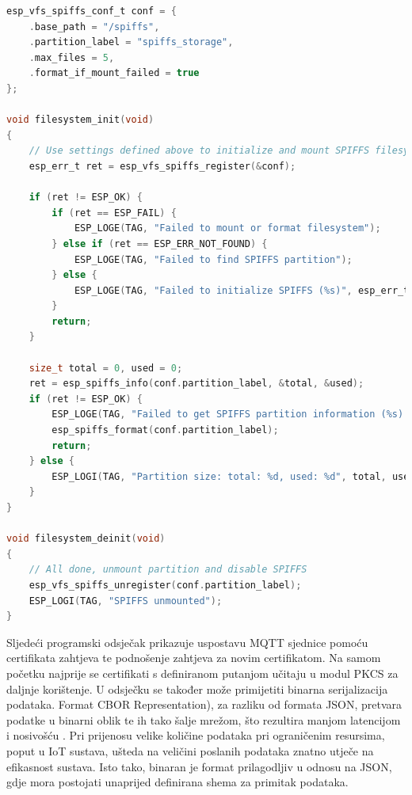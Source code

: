 \begin{lstlisting}[caption={Inicijalizacije memorije tipa SPIFFS}, language=c]
esp_vfs_spiffs_conf_t conf = {
	.base_path = "/spiffs",
	.partition_label = "spiffs_storage",
	.max_files = 5,
	.format_if_mount_failed = true
};

void filesystem_init(void)
{
	// Use settings defined above to initialize and mount SPIFFS filesystem.
	esp_err_t ret = esp_vfs_spiffs_register(&conf);
	
	if (ret != ESP_OK) {
		if (ret == ESP_FAIL) {
			ESP_LOGE(TAG, "Failed to mount or format filesystem");
		} else if (ret == ESP_ERR_NOT_FOUND) {
			ESP_LOGE(TAG, "Failed to find SPIFFS partition");
		} else {
			ESP_LOGE(TAG, "Failed to initialize SPIFFS (%s)", esp_err_to_name(ret));
		}
		return;
	}
	
	size_t total = 0, used = 0;
	ret = esp_spiffs_info(conf.partition_label, &total, &used);
	if (ret != ESP_OK) {
		ESP_LOGE(TAG, "Failed to get SPIFFS partition information (%s). Formatting...", esp_err_to_name(ret));
		esp_spiffs_format(conf.partition_label);
		return;
	} else {
		ESP_LOGI(TAG, "Partition size: total: %d, used: %d", total, used);
	}
}

void filesystem_deinit(void)
{
	// All done, unmount partition and disable SPIFFS
	esp_vfs_spiffs_unregister(conf.partition_label);
	ESP_LOGI(TAG, "SPIFFS unmounted");
}
\end{lstlisting}

Sljedeći programski odsječak prikazuje uspostavu MQTT sjednice pomoću certifikata zahtjeva te podnošenje zahtjeva za novim certifikatom. Na samom početku najprije se certifikati s definiranom putanjom učitaju u modul PKCS za daljnje korištenje. U odsječku se također može primijetiti binarna serijalizacija podataka. Format CBOR  Representation), za razliku od formata JSON, pretvara podatke u binarni oblik te ih tako šalje mrežom, što rezultira manjom latencijom i nosivošću  \cite{cbor}. Pri prijenosu velike količine podataka pri ograničenim resursima, poput u IoT sustava, ušteda na veličini poslanih podataka znatno utječe na efikasnost sustava. Isto tako, binaran je format prilagodljiv u odnosu na JSON, gdje mora postojati unaprijed definirana shema za primitak podataka.

